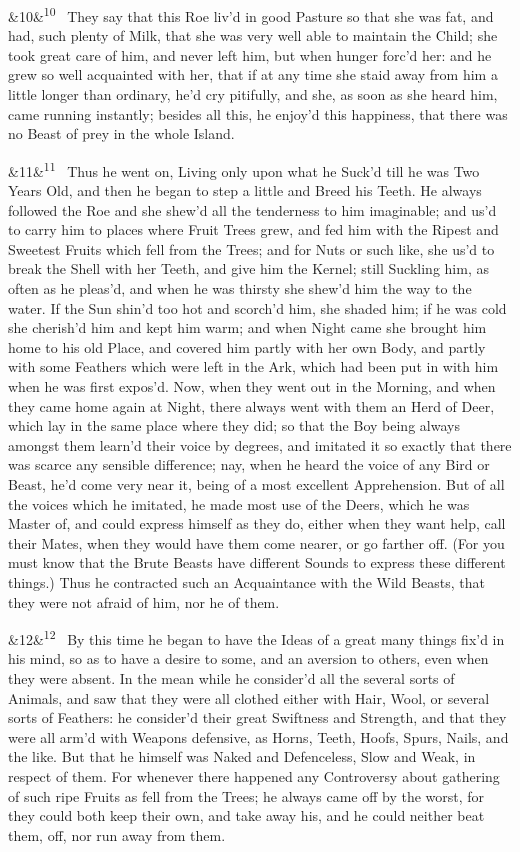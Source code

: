 \documentclass[12pt]{article}
\newcommand{\para}[1][]{\par\noindent\ifx&#1&\else\textsuperscript{\footnotesize #1}~\fi}
\begin{document}
\para[10] They say that this Roe liv'd in good Pasture so that she was fat, and had, such plenty of Milk, that she was very well able to maintain the Child; she took great care of him, and never left him, but when hunger forc'd her: and he grew so well acquainted with her, that if at any time she staid away from him a little longer than ordinary, he'd cry pitifully, and she, as soon as she heard him, came running instantly; besides all this, he enjoy'd this happiness, that there was no Beast of prey in the whole Island.

\para[11] Thus he went on, Living only upon what he Suck'd till he was Two Years Old, and then he began to step a little and Breed his Teeth. He always followed the Roe and she shew'd all the tenderness to him imaginable; and us'd to carry him to places where Fruit Trees grew, and fed him with the Ripest and Sweetest Fruits which fell from the Trees; and for Nuts or such like, she us'd to break the Shell with her Teeth, and give him the Kernel; still Suckling him, as often as he pleas'd, and when he was thirsty she shew'd him the way to the water. If the Sun shin'd too hot and scorch'd him, she shaded him; if he was cold she cherish'd him and kept him warm; and when Night came she brought him home to his old Place, and covered him partly with her own Body, and partly with some Feathers which were left in the Ark, which had been put in with him when he was first expos'd. Now, when they went out in the Morning, and when they came home again at Night, there always went with them an Herd of Deer, which lay in the same place where they did; so that the Boy being always amongst them learn'd their voice by degrees, and imitated it so exactly that there was scarce any sensible difference; nay, when he heard the voice of any Bird or Beast, he'd come very near it, being of a most excellent Apprehension. But of all the voices which he imitated, he made most use of the Deers, which he was Master of, and could express himself as they do, either when they want help, call their Mates, when they would have them come nearer, or go farther off. (For you must know that the Brute Beasts have different Sounds to express these different things.) Thus he contracted such an Acquaintance with the Wild Beasts, that they were not afraid of him, nor he of them.

\para[12] By this time he began to have the Ideas of a great many things fix'd in his mind, so as to have a desire to some, and an aversion to others, even when they were absent. In the mean while he consider'd all the several sorts of Animals, and saw that they were all clothed either with Hair, Wool, or several sorts of Feathers: he consider'd their great Swiftness and Strength, and that they were all arm'd with Weapons defensive, as Horns, Teeth, Hoofs, Spurs, Nails, and the like. But that he himself was Naked and Defenceless, Slow and Weak, in respect of them. For whenever there happened any Controversy about gathering of such ripe Fruits as fell from the Trees; he always came off by the worst, for they could both keep their own, and take away his, and he could neither beat them, off, nor run away from them.
\end{document}
